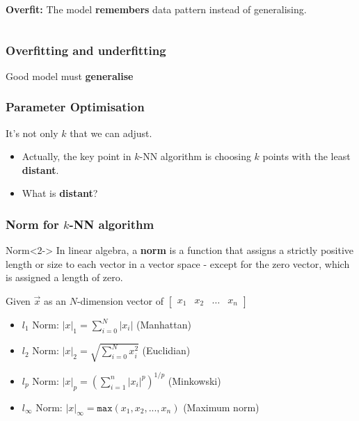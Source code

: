 \documentclass[aspectratio=169]{beamer}
\begin{document}
\begin{frame}
\begin{columns}[t]
		 \textbf{Overfit:} The model \textbf{remembers} data pattern instead of generalising.
	\end{columns}
\end{frame}

\begin{frame}
	\frametitle{Overfitting and underfitting}
	\begin{center}
		{\LARGE Good model must \textbf{generalise}}\\
	\end{center}
\end{frame}

\begin{frame}
	\frametitle{Parameter Optimisation}
	 It's not only $k$ that we can adjust.
	\begin{itemize}
		\item<3-> Actually, the key point in $k$-NN algorithm is choosing $k$ points with the least \textbf{distant}.
		\item<4-> What is \textbf{distant}?
	\end{itemize}
\end{frame}

\begin{frame}
	\frametitle{Norm for $k$-NN algorithm}
	\begin{block}{Norm}<2->
		In linear algebra, a \textbf{norm} is a function that assigns a strictly positive length or size to each vector in a vector space - except for the zero vector, which is assigned a length of zero.
	\end{block}

	 Given $\vec{x}$ as an $N$-dimension vector of $\begin{bmatrix}
			x_1 & x_2 & \hdots & x_n
		\end{bmatrix}$
	\begin{itemize}
		\item<4-> $l_1$ Norm: $\left|x\right|_1 = \sum_{i=0}^{N}\left|x_i\right|$ (Manhattan)
		\item<5-> $l_2$ Norm: $\left|x\right|_2 = \sqrt{\sum_{i=0}^{N}x_i^2}$ (Euclidian)
		\item<6-> $l_p$ Norm: $\left|x\right|_p = \left(\sum_{i=1}^n |x_i|^p\right)^{1/p}$ (Minkowski)
		\item<6-> $l_\infty$ Norm: $\left|x\right|_\infty = \texttt{max}(x_1, x_2, ..., x_n)$ (Maximum norm)
	\end{itemize}
\end{frame}
\end{document}
